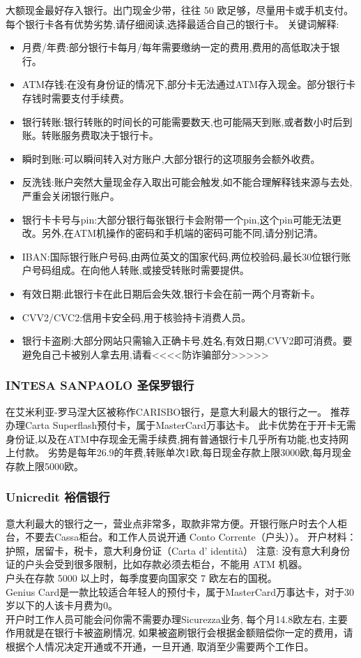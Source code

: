 大额现金最好存入银行。出门现金少带，往往 50 欧足够，尽量用卡或手机支付。
每个银行卡各有优势劣势,请仔细阅读,选择最适合自己的银行卡。
关键词解释:\\
\begin{itemize}
\item 月费/年费:部分银行卡每月/每年需要缴纳一定的费用,费用的高低取决于银行。
\item ATM存钱:在没有身份证的情况下,部分卡无法通过ATM存入现金。部分银行卡存钱时需要支付手续费。
\item 银行转账:银行转账的时间长的可能需要数天,也可能隔天到账,或者数小时后到账。转账服务费取决于银行卡。
\item 瞬时到账:可以瞬间转入对方账户,大部分银行的这项服务会额外收费。
\item 反洗钱:账户突然大量现金存入取出可能会触发,如不能合理解释钱来源与去处,严重会关闭银行账户。
\item 银行卡卡号与pin:大部分银行每张银行卡会附带一个pin,这个pin可能无法更改。另外,在ATM机操作的密码和手机端的密码可能不同,请分别记清。
\item IBAN:国际银行账户号码,由两位英文的国家代码,两位校验码,最长30位银行账户号码组成。在向他人转账,或接受转账时需要提供。
\item 有效日期:此银行卡在此日期后会失效,银行卡会在前一两个月寄新卡。
\item CVV2/CVC2:信用卡安全码,用于核验持卡消费人员。
\item 银行卡盗刷:大部分网站只需输入正确卡号,姓名,有效日期,CVV2即可消费。要避免自己卡被别人拿去用,请看<<<<防诈骗部分>>>>>
\end{itemize}

\subsubsection{INTESA SANPAOLO 圣保罗银行}

在艾米利亚-罗马涅大区被称作CARISBO银行，是意大利最大的银行之一。
推荐办理Carta Superflash预付卡，属于MasterCard万事达卡。
此卡优势在于开卡无需身份证,以及在ATM中存现金无需手续费,拥有普通银行卡几乎所有功能,也支持网上付款。
劣势是每年26.9的年费,转账单次1欧,每日现金存款上限3000欧,每月现金存款上限5000欧。

\subsubsection{Unicredit 裕信银行}
意大利最大的银行之一，营业点非常多，取款非常方便。开银行账户时去个人柜台，不要去Cassa柜台。和工作人员说开通 Conto Corrente（户头））。
开户材料：护照，居留卡，税卡，意大利身份证（Carta d’ identità）
注意:
没有意大利身份证的户头会受到很多限制，比如存款必须去柜台，不能用 ATM 机器。\\
户头在存款 5000 以上时，每季度要向国家交 7 欧左右的国税。\\
Genius Card是一款比较适合年轻人的预付卡，属于MasterCard万事达卡，对于30岁以下的人该卡月费为0。\\
开户时工作人员可能会问你需不需要办理Sicurezza业务, 每个月14.8欧左右, 主要作用就是在银行卡被盗刷情况, 如果被盗刷银行会根据金额赔偿你一定的费用，请根据个人情况决定开通或不开通，一旦开通, 取消至少需要两个工作日。 
